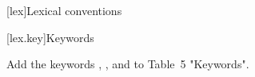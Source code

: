 
\begingroup
\renewcommand{\cleardoublepage}{}
\renewcommand{\clearpage}{}
[lex]{Lexical conventions}
\endgroup

\setcounter{section}{10}
[lex.key]{Keywords}

Add the keywords , , and
 to Table~5 "Keywords".

